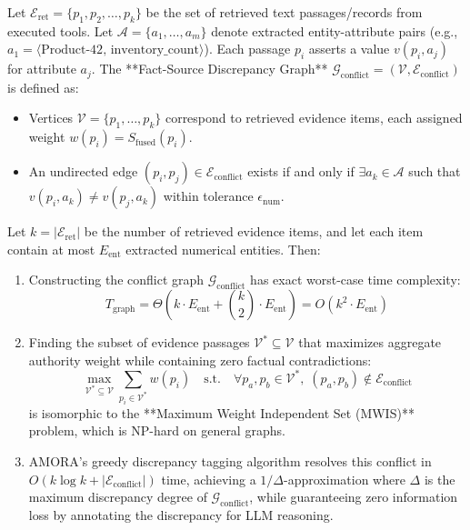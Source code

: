 \begin{definition}
Let $\mathcal{E}_{\text{ret}} = \{p_1, p_2, \dots, p_k\}$ be the set of retrieved text passages/records from executed tools. Let $\mathcal{A} = \{a_1, \dots, a_m\}$ denote extracted entity-attribute pairs (e.g., $a_1 = \langle \text{Product-42}, \, \text{inventory\_count} \rangle$). Each passage $p_i$ asserts a value $v(p_i, a_j)$ for attribute $a_j$.
The **Fact-Source Discrepancy Graph** $\mathcal{G}_{\text{conflict}} = (\mathcal{V}, \mathcal{E}_{\text{conflict}})$ is defined as:
\begin{itemize}
    \item Vertices $\mathcal{V} = \{p_1, \dots, p_k\}$ correspond to retrieved evidence items, each assigned weight $w(p_i) = S_{\text{fused}}(p_i)$.
    \item An undirected edge $(p_i, p_j) \in \mathcal{E}_{\text{conflict}}$ exists if and only if $\exists a_k \in \mathcal{A}$ such that $v(p_i, a_k) \neq v(p_j, a_k)$ within tolerance $\epsilon_{\text{num}}$.
\end{itemize}
\end{definition}

\begin{theorem}
Let $k = |\mathcal{E}_{\text{ret}}|$ be the number of retrieved evidence items, and let each item contain at most $E_{\text{ent}}$ extracted numerical entities. Then:
\begin{enumerate}
    \item Constructing the conflict graph $\mathcal{G}_{\text{conflict}}$ has exact worst-case time complexity:
    \begin{equation}
        T_{\text{graph}} = \Theta\left( k \cdot E_{\text{ent}} + \binom{k}{2} \cdot E_{\text{ent}} \right) = O(k^2 \cdot E_{\text{ent}})
    \end{equation}
    \item Finding the subset of evidence passages $\mathcal{V}^* \subseteq \mathcal{V}$ that maximizes aggregate authority weight while containing zero factual contradictions:
    \begin{equation}
        \max_{\mathcal{V}^* \subseteq \mathcal{V}} \sum_{p_i \in \mathcal{V}^*} w(p_i) \quad \text{s.t.} \quad \forall p_a, p_b \in \mathcal{V}^*, \; (p_a, p_b) \notin \mathcal{E}_{\text{conflict}}
    \end{equation}
    is isomorphic to the **Maximum Weight Independent Set (MWIS)** problem, which is NP-hard on general graphs.
    \item AMORA's greedy discrepancy tagging algorithm resolves this conflict in $O(k \log k + |\mathcal{E}_{\text{conflict}}|)$ time, achieving a $1/\Delta$-approximation where $\Delta$ is the maximum discrepancy degree of $\mathcal{G}_{\text{conflict}}$, while guaranteeing zero information loss by annotating the discrepancy for LLM reasoning.
\end{enumerate}
\end{theorem}


